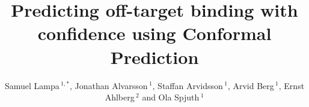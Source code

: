 \documentclass[utf8]{frontiersSCNS} %
\def\firstAuthorLast{Lampa {et~al.}} %
\def\Authors{Samuel Lampa\,$^{1,*}$, Jonathan Alvarsson\,$^{1}$, Staffan Arvidsson\,$^{1}$, Arvid Berg\,$^{1}$, Ernst Ahlberg\,$^{2}$  and Ola Spjuth\,$^{1}$}
\begin{document}
\onecolumn
{}

\title[Predicting off-target binding with confidence using Conformal
Prediction]{Predicting off-target binding with confidence using Conformal
Prediction}

\author[\firstAuthorLast ]{\Authors} %
\address{} %
\correspondance{} %

\extraAuth{}%


\maketitle
\end{document}
